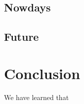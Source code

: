 \documentclass[12pt,twoside]{article}
\theoremstyle{plain}
\theoremstyle{definition}
\theoremstyle{remark}
\begin{document}
\subsection{Nowdays}
\label{sec:nowdays}

\subsection{Future}
\label{sec:future}

\section{Conclusion}
\label{sec:conclusion}

We have learned that

%
%
\nocite{*}


\newpage


\end{document}
